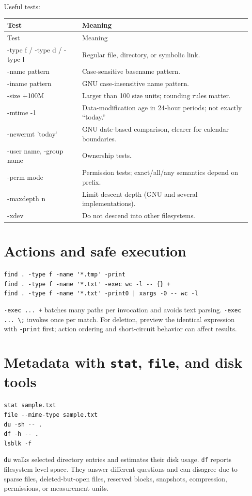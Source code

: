 \documentclass[11pt,oneside,openany]{book}
\begin{document}
Useful tests:
\begin{longtable}{>{\ttfamily}p{}p{}}
\toprule
Test & Meaning \\
\midrule
\endfirsthead\toprule Test & Meaning \\
\midrule\endhead
-type f / -type d / -type l & Regular file, directory, or symbolic link. \\
-name pattern & Case-sensitive basename pattern. \\
-iname pattern & GNU case-insensitive name pattern. \\
-size +100M & Larger than 100 size units; rounding rules matter. \\
-mtime -1 & Data-modification age in 24-hour periods; not exactly “today.” \\
-newermt 'today' & GNU date-based comparison, clearer for calendar boundaries. \\
-user name, -group name & Ownership tests. \\
-perm mode & Permission tests; exact/all/any semantics depend on prefix. \\
-maxdepth n & Limit descent depth (GNU and several implementations). \\
-xdev & Do not descend into other filesystems. \\
\bottomrule
\end{longtable}

\section{Actions and safe execution}
\begin{lstlisting}
find . -type f -name '*.tmp' -print
find . -type f -name '*.txt' -exec wc -l -- {} +
find . -type f -name '*.txt' -print0 | xargs -0 -- wc -l
\end{lstlisting}
\texttt{-exec ... {} +} batches many paths per invocation and avoids text parsing. \texttt{-exec ... {} \textbackslash;} invokes once per match. For deletion, preview the identical expression with \texttt{-print} first; action ordering and short-circuit behavior can affect results.

\section{Metadata with \texttt{stat}, \texttt{file}, and disk tools}
\begin{lstlisting}
stat sample.txt
file --mime-type sample.txt
du -sh -- .
df -h -- .
lsblk -f
\end{lstlisting}
\texttt{du} walks selected directory entries and estimates their disk usage. \texttt{df} reports filesystem-level space. They answer different questions and can disagree due to sparse files, deleted-but-open files, reserved blocks, snapshots, compression, permissions, or measurement units.
\end{document}
